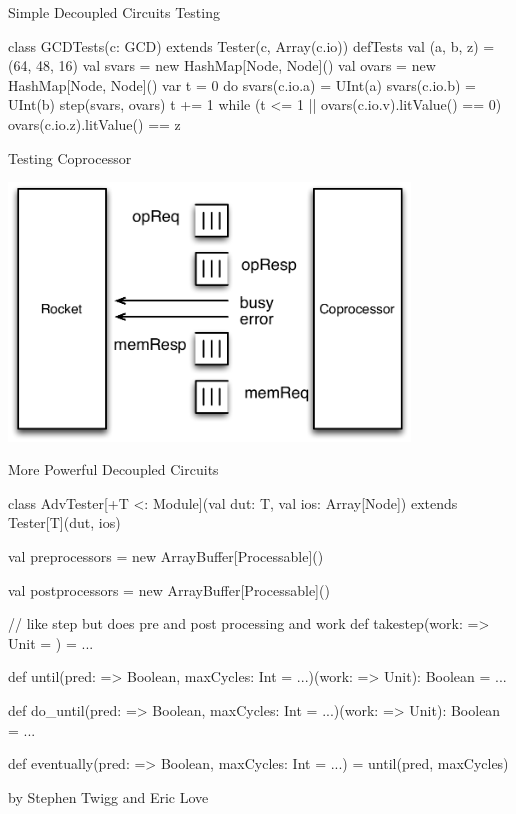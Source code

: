 \documentclass[xcolor=pdflatex,dvipsnames,table]{beamer}
\begin{document}
\begin{frame}[fragile]{Simple Decoupled Circuits Testing}
\begin{scala}
class GCDTests(c: GCD) extends Tester(c, Array(c.io)) {
  defTests {
    val (a, b, z) = (64, 48, 16)
    val svars = new HashMap[Node, Node]()
    val ovars = new HashMap[Node, Node]()
    var t = 0
    do {
      svars(c.io.a) = UInt(a)
      svars(c.io.b) = UInt(b)
      step(svars, ovars)
      t += 1
    } while (t <= 1 || ovars(c.io.v).litValue() == 0)
    ovars(c.io.z).litValue() == z
  }
}
\end{scala}
\end{frame}

\begin{frame}[fragile]{Testing Coprocessor}
\begin{center}
\includegraphics[width=0.8\textwidth]{figs/rocket-coprocessor.pdf}
\end{center}
\end{frame}

\begin{frame}[fragile]{More Powerful Decoupled Circuits}

{
\begin{scala}
class AdvTester[+T <: Module](val dut: T, val ios: Array[Node])
    extends Tester[T](dut, ios) {

  val preprocessors = new ArrayBuffer[Processable]()

  val postprocessors = new ArrayBuffer[Processable]()

  // like step but does pre and post processing and work
  def takestep(work: => Unit = {}) = ...

  def until(pred: => Boolean, maxCycles: Int = ...)(work: => Unit): Boolean = ...

  def do_until(pred: => Boolean, maxCycles: Int = ...)(work: => Unit): Boolean = ...

  def eventually(pred: => Boolean, maxCycles: Int = ...) = 
    until(pred, maxCycles){ }
}
\end{scala}
}
\vfill 
{\tiny by Stephen Twigg and Eric Love}
\end{frame}
\end{document}
